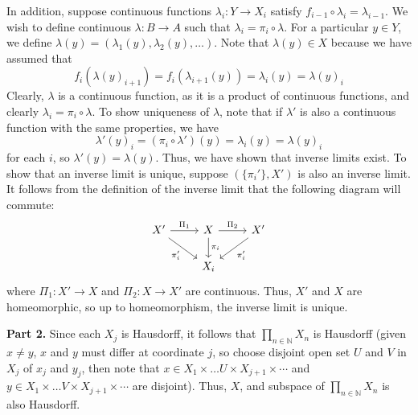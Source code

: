 \documentclass[aps,pra,showpacs,notitlepage,onecolumn,superscriptaddress,nofootinbib]{revtex4-1}
\theoremstyle{definition}
\begin{document}
In addition, suppose continuous functions $\lambda_i : Y \rightarrow X_i$ satisfy $f_{i - 1} \circ \lambda_i = \lambda_{i - 1}$. We wish to define continuous $\lambda : B \rightarrow A$ such that
$\lambda_i = \pi_i \circ \lambda$. For a particular $y \in Y$, we define $\lambda(y) = (\lambda_1(y), \lambda_2(y), \dots)$. Note that $\lambda(y) \in X$ because we have assumed that
$$f_i(\lambda(y)_{i + 1}) = f_i(\lambda_{i + 1}(y)) = \lambda_i(y) = \lambda(y)_i$$
Clearly, $\lambda$ is a continuous function, as it is a product of continuous functions, and clearly $\lambda_i = \pi_i \circ \lambda$. To show uniqueness of $\lambda$, note that if $\lambda'$ is also a continuous function with
the same properties, we have
\begin{equation}
  \lambda'(y)_i = (\pi_i \circ \lambda')(y) = \lambda_i(y) = \lambda(y)_i
\end{equation}
for each $i$, so $\lambda'(y) = \lambda(y)$. Thus, we have shown that inverse limits exist. To show that an inverse limit is unique, suppose $(\{\pi_i'\}, X')$ is also an inverse limit. It follows from the
definition of the inverse limit that the following diagram will commute:
\[\begin{tikzcd}
	          {X'} & X & {X'} \\
	          & {X_i}
	          \arrow["{\Pi_1}", from=1-1, to=1-2]
	          \arrow["{\Pi_2}", from=1-2, to=1-3]
	          \arrow["{\pi_i}", from=1-2, to=2-2]
	          \arrow["{\pi_i'}"', from=1-1, to=2-2]
	          \arrow["{\pi_i'}", from=1-3, to=2-2]
\end{tikzcd}\]
where $\Pi_1 : X' \rightarrow X$ and $\Pi_2 : X \rightarrow X'$ are continuous. Thus, $X'$ and $X$ are homeomorphic, so up to homeomorphism, the inverse limit is unique.
\newline

\noindent \textbf{Part 2.} Since each $X_j$ is Hausdorff, it follows that $\prod_{n \in \mathbb{N}} X_n$ is Hausdorff (given $x \neq y$, $x$ and $y$ must differ at coordinate $j$, so choose disjoint open set $U$ and $V$ in $X_j$ of $x_j$ and $y_j$, then
note that $x \in X_1 \times \dots U \times X_{j + 1} \times \cdots$ and $y \in X_1 \times \dots V \times X_{j + 1} \times \cdots$ are disjoint). Thus, $X$, and subspace of $\prod_{n \in \mathbb{N}} X_n$ is also Hausdorff.
\end{document}
